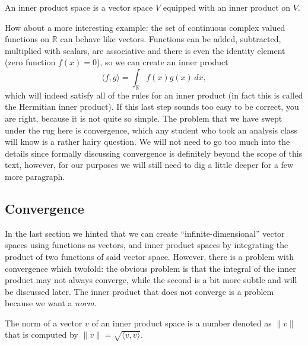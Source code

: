 \begin{definition}
  \nocite{axler_linear_2014}
  An inner product space is a vector space \(V\) equipped with an inner
  product on \(V\).
\end{definition}

How about a more interesting example: the set of continuous complex valued
functions on $\mathbb{R}$ can behave like vectors.  Functions can be added,
subtracted, multiplied with scalars, are associative and there is even the
identity element (zero function \(f(x) = 0\)), so we can create an inner
product
\[
  \langle f, g \rangle = \int_\mathbb{R} f(x) \overline{g(x)} \, dx,
\]
which will indeed satisfy all of the rules for an inner product (in fact this
is called the Hermitian inner product\nocite{allard_mathematics_2009}). If
this last step sounds too easy to be correct, you are right, because it is not
quite so simple. The problem that we have swept under the rug here is
convergence, which any student who took an analysis class will know is a
rather hairy question. We will not need to go too much into the details since
formally discussing convergence is definitely beyond the scope of this text,
however, for our purposes we will still need to dig a little deeper for a few
more paragraph.

\subsection{Convergence}

In the last section we hinted that we can create ``infinite-dimensional''
vector spaces using functions as vectors, and inner product spaces by
integrating the product of two functions of said vector space. However, there
is a problem with convergence which twofold: the obvious problem is that the
integral of the inner product may not always converge, while the second is a
bit more subtle and will be discussed later. The inner product that does
not converge is a problem because we want a \emph{norm}.

\begin{definition}[\(L^2\) Norm]
  \nocite{axler_linear_2014}
  The norm of a vector \(v\) of an inner product space is a number
  denoted as \(\| v \|\) that is computed by \(\| v \| = \sqrt{\langle v, v
  \rangle}\).
\end{definition}

